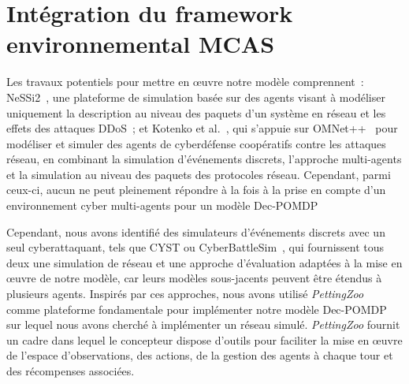 

\section{Intégration du framework environnemental MCAS}

\noindent
Les travaux potentiels pour mettre en œuvre notre modèle comprennent~: NeSSi2~\cite{DGrunewald2011}, une plateforme de simulation basée sur des agents visant à modéliser uniquement la description au niveau des paquets d'un système en réseau et les effets des attaques DDoS~; et Kotenko et al.~\cite{IKotenko2007}, qui s'appuie sur OMNet++~\cite{Varga2010} pour modéliser et simuler des agents de cyberdéfense coopératifs contre les attaques réseau, en combinant la simulation d'événements discrets, l'approche multi-agents et la simulation au niveau des paquets des protocoles réseau.
Cependant, parmi ceux-ci, aucun ne peut pleinement répondre à la fois à la prise en compte d'un environnement cyber multi-agents pour un modèle Dec-POMDP

Cependant, nous avons identifié des simulateurs d'événements discrets avec un seul cyberattaquant, tels que CYST\cite{drasar_session-level_2020} ou CyberBattleSim~\cite{cyberbattlesim}, qui fournissent tous deux une simulation de réseau et une approche d'évaluation adaptées à la mise en œuvre de notre modèle, car leurs modèles sous-jacents peuvent être étendus à plusieurs agents. Inspirés par ces approches, nous avons utilisé \textit{PettingZoo}~\cite{terry2020pettingzoo} comme plateforme fondamentale pour implémenter notre modèle Dec-POMDP sur lequel nous avons cherché à implémenter un réseau simulé. \textit{PettingZoo} fournit un cadre dans lequel le concepteur dispose d'outils pour faciliter la mise en œuvre de l'espace d'observations, des actions, de la gestion des agents à chaque tour et des récompenses associées.


